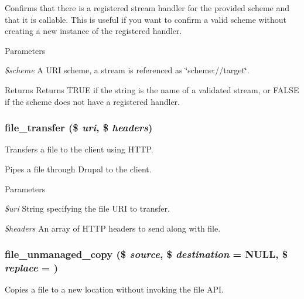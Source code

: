 Confirms that there is a registered stream handler for the provided scheme and that it is callable. This is useful if you want to confirm a valid scheme without creating a new instance of the registered handler.


\begin{DoxyParams}{Parameters}
\item[{\em \$scheme}]A URI scheme, a stream is referenced as \char`\"{}scheme://target\char`\"{}.\end{DoxyParams}
\begin{DoxyReturn}{Returns}
Returns TRUE if the string is the name of a validated stream, or FALSE if the scheme does not have a registered handler. 
\end{DoxyReturn}
\hypertarget{group__file_ga7b047ab67ab5bb3882d573d7e06ab485}{
\subsubsection[{file\_\-transfer}]{\setlength{\rightskip}{0pt plus 5cm}file\_\-transfer (\$ {\em uri}, \/  \$ {\em headers})}}
\label{group__file_ga7b047ab67ab5bb3882d573d7e06ab485}
Transfers a file to the client using HTTP.

Pipes a file through Drupal to the client.


\begin{DoxyParams}{Parameters}
\item[{\em \$uri}]String specifying the file URI to transfer. \item[{\em \$headers}]An array of HTTP headers to send along with file. \end{DoxyParams}
\hypertarget{group__file_ga19b0d88682d26b7e5d03cb22ac2af391}{
\subsubsection[{file\_\-unmanaged\_\-copy}]{\setlength{\rightskip}{0pt plus 5cm}file\_\-unmanaged\_\-copy (\$ {\em source}, \/  \$ {\em destination} = {\ttfamily NULL}, \/  \$ {\em replace} = {})}}
\label{group__file_ga19b0d88682d26b7e5d03cb22ac2af391}
Copies a file to a new location without invoking the file API.

